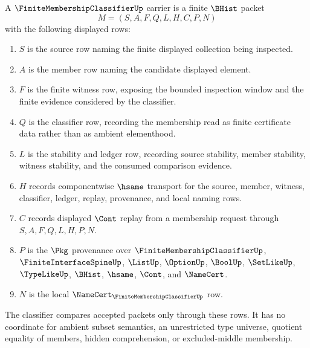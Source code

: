 \begin{definition}
\label{def:finite-membership-classifier-carrier}
A $\FiniteMembershipClassifierUp$ carrier is a finite $\BHist$ packet
$$
M=(S,A,F,Q,L,H,C,P,N)
$$
with the following displayed rows:
\begin{enumerate}
\item $S$ is the source row naming the finite displayed collection being inspected.
\item $A$ is the member row naming the candidate displayed element.
\item $F$ is the finite witness row, exposing the bounded inspection window and the finite evidence considered by the classifier.
\item $Q$ is the classifier row, recording the membership read as finite certificate data rather than as ambient elementhood.
\item $L$ is the stability and ledger row, recording source stability, member stability, witness stability, and the consumed comparison evidence.
\item $H$ records componentwise $\hsame$ transport for the source, member, witness, classifier, ledger, replay, provenance, and local naming rows.
\item $C$ records displayed $\Cont$ replay from a membership request through $S,A,F,Q,L,H,P,N$.
\item $P$ is the $\Pkg$ provenance over $\FiniteMembershipClassifierUp$, $\FiniteInterfaceSpineUp$, $\ListUp$, $\OptionUp$, $\BoolUp$, $\SetLikeUp$, $\TypeLikeUp$, $\BHist$, $\hsame$, $\Cont$, and $\NameCert$.
\item $N$ is the local $\NameCert_{\FiniteMembershipClassifierUp}$ row.
\end{enumerate}
The classifier compares accepted packets only through these rows. It has no coordinate for ambient subset semantics, an unrestricted type universe, quotient equality of members, hidden comprehension, or excluded-middle membership.
\end{definition}

